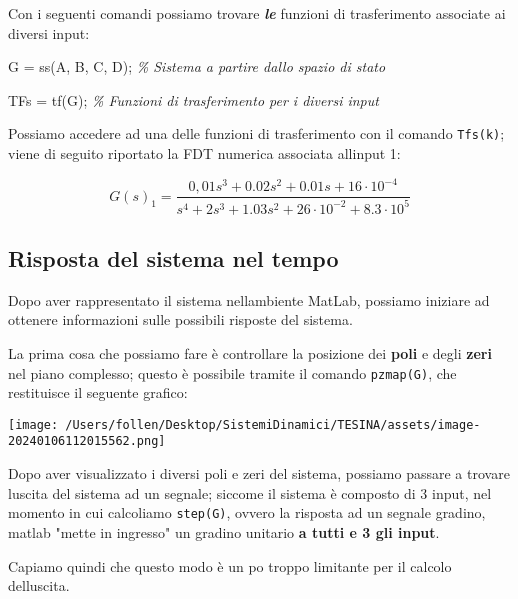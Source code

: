\documentclass[
]{article}
\newenvironment{Shaded}{}{}
\newcommand{\CommentTok}[1]{\textcolor[rgb]{0.38,0.63,0.69}{\textit{#1}}}
\newcommand{\NormalTok}[1]{#1}
\newcommand{\OperatorTok}[1]{\textcolor[rgb]{0.40,0.40,0.40}{#1}}
\newcommand{\VariableTok}[1]{\textcolor[rgb]{0.10,0.09,0.49}{#1}}
\begin{document}
Con i seguenti comandi possiamo trovare \emph{\textbf{le}} funzioni di
trasferimento associate ai diversi input:

\begin{Shaded}
\begin{Highlighting}[]
\VariableTok{G} \OperatorTok{=} \VariableTok{ss}\NormalTok{(}\VariableTok{A}\OperatorTok{,} \VariableTok{B}\OperatorTok{,} \VariableTok{C}\OperatorTok{,} \VariableTok{D}\NormalTok{)}\OperatorTok{;}         \CommentTok{\% Sistema a partire dallo spazio di stato              }

\VariableTok{TFs} \OperatorTok{=} \VariableTok{tf}\NormalTok{(}\VariableTok{G}\NormalTok{)}\OperatorTok{;}                \CommentTok{\% Funzioni di trasferimento per i diversi input}
\end{Highlighting}
\end{Shaded}

Possiamo accedere ad una delle funzioni di trasferimento con il comando
\texttt{Tfs(k)}; viene di seguito riportato la FDT numerica associata
all\textquotesingle input 1:

\[G(s)_{1} = \frac{0,01s^3+0.02s^2+0.01s+16\cdot 10^{-4}}{s^4 + 2s^3 +1.03s^2+26\cdot10^{-2}+8.3\cdot10^{5}}\]

\hypertarget{risposta-del-sistema-nel-tempo}{%
\subsection{Risposta del sistema nel
tempo}\label{risposta-del-sistema-nel-tempo}}

Dopo aver rappresentato il sistema nell\textquotesingle ambiente MatLab,
possiamo iniziare ad ottenere informazioni sulle possibili risposte del
sistema.

La prima cosa che possiamo fare è controllare la posizione dei
\textbf{poli} e degli \textbf{zeri} nel piano complesso; questo è
possibile tramite il comando \texttt{pzmap(G)}, che restituisce il
seguente grafico:

\texttt{[image: /Users/follen/Desktop/SistemiDinamici/TESINA/assets/image-20240106112015562.png]}

Dopo aver visualizzato i diversi poli e zeri del sistema, possiamo
passare a trovare l\textquotesingle uscita del sistema ad un segnale;
siccome il sistema è composto di 3 input, nel momento in cui calcoliamo
\texttt{step(G)}, ovvero la risposta ad un segnale gradino, matlab
"mette in ingresso" un gradino unitario \textbf{a tutti e 3 gli input}.

Capiamo quindi che questo modo è un po\textquotesingle{} troppo
limitante per il calcolo dell\textquotesingle uscita.
\end{document}
